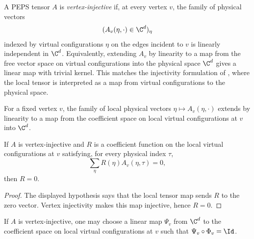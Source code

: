 \begin{definition}%
    \label{def:IsVertexInjective}
    \leanok
    A PEPS tensor $A$ is \emph{vertex-injective} if, at every vertex $v$, the
    family of physical vectors
    \[
        (A_v(\eta, \cdot) \in \C^d)_{\eta}
    \]
    indexed by virtual configurations $\eta$ on the edges incident to $v$ is
    linearly independent in $\C^d$. Equivalently, extending $A_v$ by linearity
    to a map from the free vector space on virtual configurations into the
    physical space $\C^d$ gives a linear map with trivial kernel. This matches
    the injectivity formulation of \cite[Section~3]{Molnar2018NormalPEPS},
    where the local tensor is interpreted as a map from virtual configurations
    to the physical space.
\end{definition}

\begin{definition}%
    \label{def:peps_localTensorMap}
    \leanok
    For a fixed vertex $v$, the family of local physical vectors
    $\eta \mapsto A_v(\eta, \cdot)$ extends by linearity to a map from the
    coefficient space on local virtual configurations at $v$ into $\C^d$.
\end{definition}

\begin{lemma}%
    \label{lem:peps_localCoeff_eq_zero_of_contract_zero}
    \leanok
    If $A$ is vertex-injective and $R$ is a coefficient function on the local
    virtual configurations at $v$ satisfying, for every physical index $\tau$,
    \[
        \sum_{\eta} R(\eta) A_v(\eta,\tau)=0,
    \]
    then $R=0$.
\end{lemma}
\begin{proof}\leanok
    The displayed hypothesis says that the local tensor map sends $R$ to the
    zero vector. Vertex injectivity makes this map injective, hence $R=0$.
\end{proof}

\begin{definition}%
    \label{def:peps_localLeftInverse}
    \leanok
    If $A$ is vertex-injective, one may choose a linear map $\Psi_v$ from
    $\C^d$ to the coefficient space on local virtual configurations at $v$
    such that $\Psi_v \circ \Phi_v = \Id$.
\end{definition}

